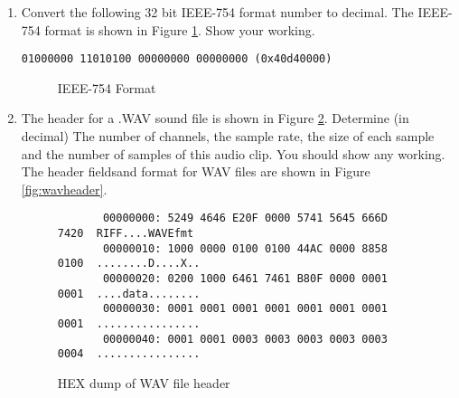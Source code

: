 \documentclass[a4paper,10pt]{article}
\begin{document}
\begin{enumerate}

\vspace{5cm}

\item Convert the following 32 bit IEEE-754 format number to decimal.
The IEEE-754 format is shown in Figure \ref{fig:ieee754}. Show your working.
\begin{center}
\texttt{01000000 11010100 00000000 00000000 (0x40d40000)}
\end{center}

\begin{figure}[h]
\begin{center}
    \caption{IEEE-754 Format}
    \label{fig:ieee754}
  \end{center}
\end{figure}



\newpage

\item The header for a .WAV sound file is shown in Figure
\ref{fig:wavhex}. Determine (in decimal) The number of channels, the sample rate, the size of each
sample and the number of samples of this audio clip. You should show any working. The header fieldsand format for WAV files are
shown in Figure \ref{fig:wavheader}. 

\begin{figure}[h]
  \begin{center}
{\small

\begin{verbatim}
       00000000: 5249 4646 E20F 0000 5741 5645 666D 7420  RIFF....WAVEfmt
       00000010: 1000 0000 0100 0100 44AC 0000 8858 0100  ........D....X..
       00000020: 0200 1000 6461 7461 B80F 0000 0001 0001  ....data........
       00000030: 0001 0001 0001 0001 0001 0001 0001 0001  ................
       00000040: 0001 0001 0003 0003 0003 0003 0003 0004  ................
\end{verbatim}}

\caption{HEX dump of WAV file header}
  \end{center}
\label{fig:wavhex}
\end{figure}


\end{enumerate}
\end{document}
